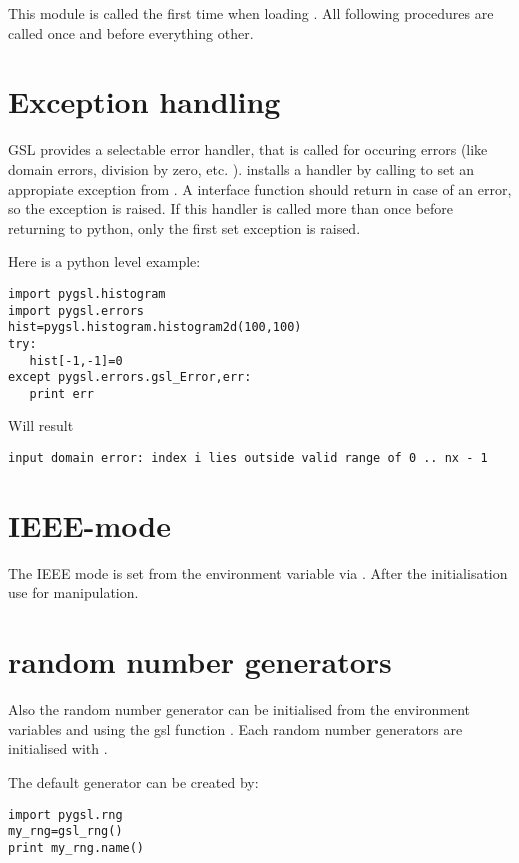 
This module is called the first time when loading .
All following procedures are called once and before everything other.

\section{Exception handling}
GSL provides a selectable error handler, that is called for occuring errors (like domain errors, division by zero, etc. ).
 installs a handler by calling  to set an appropiate exception from .
A  interface function should return  in case of an error, so the exception is raised.
If this handler is called more than once before returning to python, only the first set exception is raised.

Here is a python level example:
\begin{verbatim}
import pygsl.histogram
import pygsl.errors
hist=pygsl.histogram.histogram2d(100,100)
try:
   hist[-1,-1]=0
except pygsl.errors.gsl_Error,err:
   print err
\end{verbatim}
Will result
\begin{verbatim}
input domain error: index i lies outside valid range of 0 .. nx - 1
\end{verbatim}

\section{IEEE-mode}
The IEEE mode is set from the environment variable  via .
After the initialisation use  for manipulation.

\section{random number generators}
Also the random number generator can be initialised from the environment variables 
and  using the gsl function .
Each random number generators are initialised with .

The default generator can be created by:\nopagebreak
\begin{verbatim}
import pygsl.rng
my_rng=gsl_rng()
print my_rng.name()
\end{verbatim}

